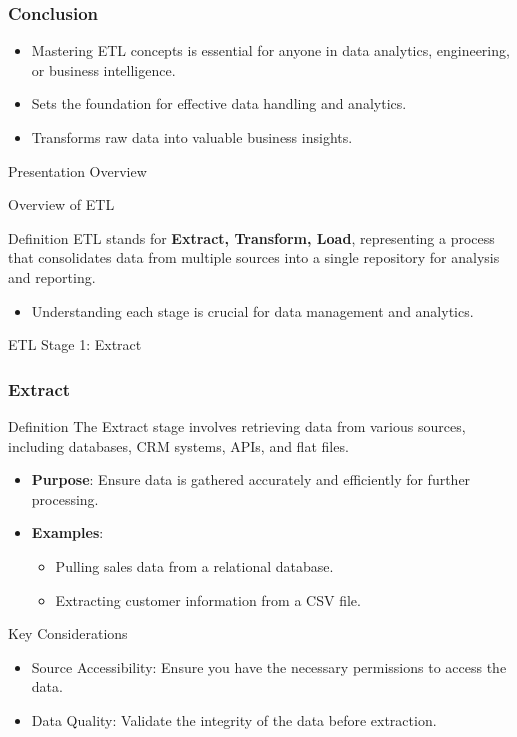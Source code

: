 \documentclass[aspectratio=169]{beamer}
\begin{document}
\begin{frame}[fragile]
    \frametitle{Conclusion}
    \begin{itemize}
        \item Mastering ETL concepts is essential for anyone in data analytics, engineering, or business intelligence.
        \item Sets the foundation for effective data handling and analytics.
        \item Transforms raw data into valuable business insights.
    \end{itemize}
\end{frame}

\begin{frame}[fragile]{Presentation Overview}
  \tableofcontents[hideallsubsections]
\end{frame}

\begin{frame}[fragile]{Overview of ETL}
  \begin{block}{Definition}
    ETL stands for \textbf{Extract, Transform, Load}, representing a process that consolidates data from multiple sources into a single repository for analysis and reporting. 
  \end{block}

  \begin{itemize}
    \item Understanding each stage is crucial for data management and analytics.
  \end{itemize}
\end{frame}

\begin{frame}[fragile]{ETL Stage 1: Extract}
  \frametitle{Extract}

  \begin{block}{Definition}
    The Extract stage involves retrieving data from various sources, including databases, CRM systems, APIs, and flat files.
  \end{block}

  \begin{itemize}
    \item \textbf{Purpose}: Ensure data is gathered accurately and efficiently for further processing.
    \item \textbf{Examples}:
      \begin{itemize}
        \item Pulling sales data from a relational database.
        \item Extracting customer information from a CSV file.
      \end{itemize}
  \end{itemize}

  \begin{block}{Key Considerations}
    \begin{itemize}
      \item Source Accessibility: Ensure you have the necessary permissions to access the data.
      \item Data Quality: Validate the integrity of the data before extraction.
    \end{itemize}
  \end{block}
\end{frame}
\end{document}
